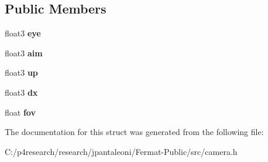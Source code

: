\subsection*{Public Members}
\begin{DoxyCompactItemize}
\item 
\mbox{\label{struct_camera_ab5328d278495c795eca66a2fcb2a442b}} 
float3 {\bfseries eye}
\item 
\mbox{\label{struct_camera_a326af25ea49f8f35737a6d0334864f8b}} 
float3 {\bfseries aim}
\item 
\mbox{\label{struct_camera_a9f5ba0529bf851c30546a57fe045fff1}} 
float3 {\bfseries up}
\item 
\mbox{\label{struct_camera_a8a27bc6c1ea9994052eb1d1c6b304a8a}} 
float3 {\bfseries dx}
\item 
\mbox{\label{struct_camera_aff7393c9cfbccd7e369091f00008da93}} 
float {\bfseries fov}
\end{DoxyCompactItemize}


The documentation for this struct was generated from the following file\+:\begin{DoxyCompactItemize}
\item 
C\+:/p4research/research/jpantaleoni/\+Fermat-\/\+Public/src/camera.\+h\end{DoxyCompactItemize}
